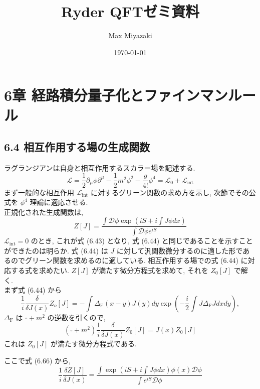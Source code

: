 \documentclass[a4paper,12pt]{article}
\title{Ryder QFTゼミ資料}
\date{\today}
\author{Max Miyazaki}
\begin{document}
\maketitle
\section*{\textrm{6章 経路積分量子化とファインマンルール}}
\subsection*{\textrm{6.4 相互作用する場の生成関数}}

ラグランジアンは自身と相互作用するスカラー場を記述する.
\begin{equation*}
    \mathcal{L} = \frac{1}{2}\partial_\mu \phi \partial^\mu -\frac{1}{2}m^2 \phi^2 -\frac{g}{4!}\phi^4 = \mathcal{L}_0 + \mathcal{L}_\textrm{int} \tag{6.65}
\end{equation*}
まず一般的な相互作用 $\mathcal{L}_\textrm{int}$ に対するグリーン関数の求め方を示し, 次節でその公式を $\phi^4$ 理論に適応させる.\\
正規化された生成関数は,
\begin{equation}
    Z[J] = \frac{\displaystyle\int \mathcal{D}\phi \exp\left( iS + i\int J \phi dx \right)}{\displaystyle \int \mathcal{D}\phi e^{iS}} \tag{6.66}
\end{equation}
$\mathcal{L}_\textrm{int} = 0$ のとき, これが式 (6.43) となり, 式 (6.44) と同じであることを示すことができたのは明らか. 式 (6.44) は $J$ に対して汎関数微分するのに適した形であるのでグリーン関数を求めるのに適している. 相互作用する場での式 (6.44) に対応する式を求めたい. $Z[J]$ が満たす微分方程式を求めて, それを $Z_0[J]$ で解く.\\
まず式 (6.44) から
\begin{equation*}
    \frac{1}{i}\frac{\delta}{\delta J(x)} Z_o[J] = -\int \Delta_\textrm{F}(x-y)J(y)dy \exp\left( -\frac{i}{2}\int J\Delta_\textrm{F}J dxdy \right),
\end{equation*}
$\Delta_\textrm{F}$ は $\square + m^2$ の逆数を引くので,
\begin{equation*}
    (\square + m^2)\frac{1}{i}\frac{\delta}{\delta J(x)}Z_0[J] = J(x)Z_0[J] \tag{6.67}
\end{equation*}
これは $Z_0[J]$ が満たす微分方程式である.\par
ここで式 (6.66) から,
\begin{equation*}
    \frac{1}{i}\frac{\delta Z[J]}{\delta J(x)} = \frac{\displaystyle \int \exp\left( iS + i\int J\phi dx \right)\phi(x)\mathcal{D}\phi}{\displaystyle \int e^{iS}\mathcal{D}\phi} \tag{6.68}
\end{equation*}
\end{document}
